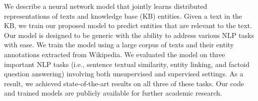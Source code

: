 We describe a neural network model that jointly learns distributed representations of texts and knowledge base (KB) entities. Given a text in the KB, we train our proposed model to predict entities that are relevant to the text. Our model is designed to be generic with the ability to address various NLP tasks with ease. We train the model using a large corpus of texts and their entity annotations extracted from Wikipedia. We evaluated the model on three important NLP tasks (i.e., sentence textual similarity, entity linking, and factoid question answering) involving both unsupervised and supervised settings. As a result, we achieved state-of-the-art results on all three of these tasks. Our code and trained models are publicly available for further academic research.